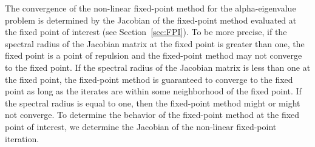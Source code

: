 The convergence of the non-linear fixed-point method for the alpha-eigenvalue problem is determined by the Jacobian of the fixed-point method evaluated at the fixed point of interest (see Section~\ref{sec:FPI}). To be more precise, if the spectral radius of the Jacobian matrix at the fixed point is greater than one, the fixed point is a point of repulsion and the fixed-point method may not converge to the fixed point. If the spectral radius of the Jacobian matrix is less than one at the fixed point, the fixed-point method is guaranteed to converge to the fixed point as long as the iterates are within some neighborhood of the fixed point. If the spectral radius is equal to one, then the fixed-point method might or might not converge. To determine the behavior of the fixed-point method at the fixed point of interest, we determine the Jacobian of the non-linear fixed-point iteration.

